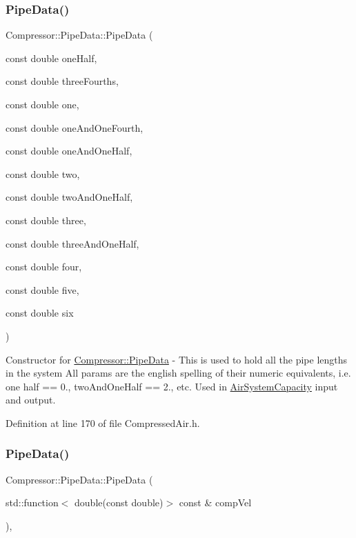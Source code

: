 \subsubsection{\texorpdfstring{Pipe\+Data()}{PipeData()}\hspace{0.1cm}{\footnotesize\ttfamily [3/6]}}
{\footnotesize\ttfamily Compressor\+::\+Pipe\+Data\+::\+Pipe\+Data (\begin{DoxyParamCaption}\item[{const double}]{one\+Half,  }\item[{const double}]{three\+Fourths,  }\item[{const double}]{one,  }\item[{const double}]{one\+And\+One\+Fourth,  }\item[{const double}]{one\+And\+One\+Half,  }\item[{const double}]{two,  }\item[{const double}]{two\+And\+One\+Half,  }\item[{const double}]{three,  }\item[{const double}]{three\+And\+One\+Half,  }\item[{const double}]{four,  }\item[{const double}]{five,  }\item[{const double}]{six }\end{DoxyParamCaption})\hspace{0.3cm}{\ttfamily [inline]}}

Constructor for \hyperlink{struct_compressor_1_1_pipe_data}{Compressor\+::\+Pipe\+Data} -\/ This is used to hold all the pipe lengths in the system All params are the english spelling of their numeric equivalents, i.\+e. one half == 0., two\+And\+One\+Half == 2., etc. Used in \hyperlink{class_compressor_1_1_air_system_capacity}{Air\+System\+Capacity} input and output. 

Definition at line 170 of file Compressed\+Air.\+h.

\mbox{\label{struct_compressor_1_1_pipe_data_af7998fd533340b0a84e78fcda91b4806}} 
\subsubsection{\texorpdfstring{Pipe\+Data()}{PipeData()}\hspace{0.1cm}{\footnotesize\ttfamily [4/6]}}
{\footnotesize\ttfamily Compressor\+::\+Pipe\+Data\+::\+Pipe\+Data (\begin{DoxyParamCaption}\item[{std\+::function$<$ double(const double)$>$ const \&}]{comp\+Vel }\end{DoxyParamCaption})\hspace{0.3cm}{\ttfamily [inline]}, {\ttfamily [explicit]}}

